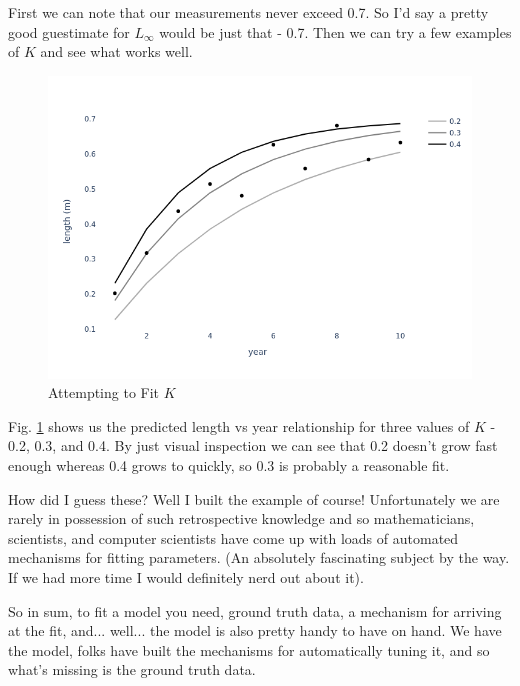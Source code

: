 \documentclass[11pt,a5paper]{book}
\begin{document}
First we can note that our measurements never exceed 0.7. So I'd say a pretty good guestimate for $L_{\infty}$ would be just that - 0.7.  Then we can try a few examples of $K$ and see what works well.
\newline

\begin{figure}[h!] 
  \includegraphics[width=\linewidth]{notebooks/Fitting/fit_lines.png}
  \caption{Attempting to Fit $K$}
  \label{fig:fitting_K}
\end{figure}

Fig. \ref{fig:fitting_K} shows us the predicted length vs year relationship for three values of $K$ - 0.2, 0.3, and 0.4. By just visual inspection we can see that 0.2 doesn't grow fast enough whereas 0.4 grows to quickly, so 0.3 is probably a reasonable fit.
\newline

How did I guess these? Well I built the example of course! Unfortunately we are rarely in possession of such retrospective knowledge and so mathematicians, scientists, and computer scientists have come up with loads of automated mechanisms for fitting parameters. (An absolutely fascinating subject by the way. If we had more time I would definitely nerd out about it). 
\newline

So in sum, to fit a model you need, ground truth data, a mechanism for arriving at the fit, and... well... the model is also pretty handy to have on hand. We have the model, folks have built the mechanisms for automatically tuning it, and so what's missing is the ground truth data. 
\newline
\end{document}
